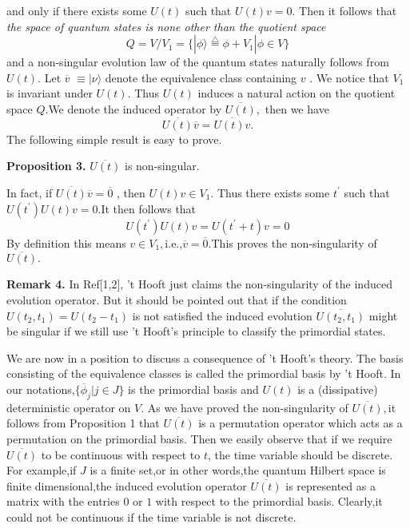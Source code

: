 \documentclass[a4paper,12pt]{article}
\begin{document}
and only if there exists some $U(t)$ such that $U(t)v=0$. Then it follows
that \textit{the space of quantum states is none other than the quotient
space }
\[
Q=V/V_1=\{|\phi \rangle \stackrel{\triangle}{=} \phi +V_1|\phi \in V\}
\]
and a non-singular evolution law of the quantum states naturally follows
from $U(t).$ Let $\overline{v}$ $\equiv |\nu \rangle $ denote the
equivalence class containing $v$ . We notice that $V_1$is invariant under $%
U(t)$. Thus $U(t)$ induces a natural action on the quotient space $Q.$We
denote the induced operator by $\overline{U(t)},$ then we have
\begin{equation}
\overline{U(t)}\overline{v}=\overline{U(t)v}.
\end{equation}
The following simple result is easy to prove.

\textbf{Proposition 3.} $\overline{U(t)}$ is non-singular.

In fact, if $\overline{U(t)}\overline{v}=\overline{0}$ , then $U(t)v\in V_1.$%
Thus there exists some $t^{\prime }$ such that $U(t^{\prime })U(t)v=0.$It
then follows that
\begin{equation}
U(t^{\prime })U(t)v=U(t^{\prime }+t)v=0
\end{equation}
By definition this means $v\in V_1,$i.e.,$\overline{v}=\overline{0}$.This
proves the non-singularity of $\overline{U(t)}.$

\textbf{Remark 4.} In Ref[1,2], 't Hooft just claims the non-singularity of
the induced evolution operator. But it should be pointed out that if the
condition $U(t_2,t_1)=U(t_2-t_1)$ is not satisfied the induced evolution $%
\overline{U(t_2,t_1)}$ might be singular if we still use 't Hooft's
principle to classify the primordial states.

We are now in a position to discuss a consequence of 't Hooft's theory. The
basis consisting of the equivalence classes is called the primordial basis
by 't Hooft. In our notations,$\{\overline{\phi }_j|j\in J\}$ is the
primordial basis and $U(t)$ is a (dissipative) deterministic operator on $V.$
As we have proved the non-singularity of $\overline{U(t)},$it follows from
Proposition 1 that $\overline{U(t)}$ is a permutation operator which acts as
a permutation on the primordial basis. Then we easily observe that if we
require $\overline{U(t)}$ to be continuous with respect to $t$, the time
variable should be discrete. For example,if $J$ is a finite set,or in other
words,the quantum Hilbert space is finite dimensional,the induced evolution
operator $\overline{U(t)}$ is represented as a matrix with the entries $0$
or $1$ with respect to the primordial basis. Clearly,it could not be
continuous if the time variable is not discrete.
\end{document}
